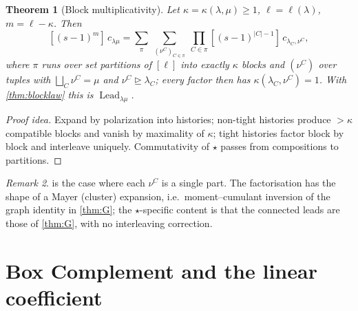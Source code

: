 \documentclass[submission]{FPSAC2027}
\newtheorem{theorem}{Theorem}[section]
\theoremstyle{definition}
\theoremstyle{remark}
\newtheorem{remark}[theorem]{Remark}
\newcommand{\Lead}{\operatorname{Lead}}
\begin{document}
\begin{theorem}[Block multiplicativity]\label{thm:blockmult}
Let $\kappa=\kappa(\lambda,\mu)\ge1$, $\ell=\ell(\lambda)$, $m=\ell-\kappa$. Then
\[ [(s-1)^m]\,c_{\lambda\mu}=\sum_{\pi}\ \sum_{(\nu^C)_{C\in\pi}}\ \prod_{C\in\pi}[(s-1)^{|C|-1}]\,c_{\lambda_C,\nu^C}, \]
where $\pi$ runs over set partitions of $[\ell]$ into exactly $\kappa$ blocks and $(\nu^C)$ over tuples with $\bigsqcup_C\nu^C=\mu$ and $\nu^C\trianglerighteq\lambda_C$; every factor then has $\kappa(\lambda_C,\nu^C)=1$. With \cref{thm:blocklaw} this is $\Lead_{\lambda\mu}$.
\end{theorem}
\begin{proof}[Proof idea]
Expand by polarization into histories; non-tight histories produce $>\kappa$ compatible blocks and vanish by maximality of $\kappa$; tight histories factor block by block and interleave uniquely. Commutativity of $\star$ passes from compositions to partitions.
\end{proof}
\begin{remark}
 is the case where each $\nu^C$ is a single part. The factorisation has the shape of a Mayer (cluster) expansion, i.e.\ moment--cumulant inversion of the graph identity in \cref{thm:G}; the $\star$-specific content is that the connected leads are those of \cref{thm:G}, with no interleaving correction.
\end{remark}

\section{Box Complement and the linear coefficient}\label{sec:box}
\end{document}
